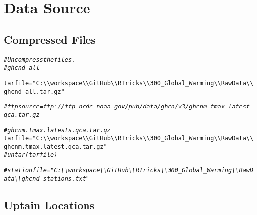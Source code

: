 \documentclass{article}\usepackage[]{graphicx}\usepackage[]{color}
\makeatletter
\newcommand{\hlstr}[1]{\textcolor[rgb]{0.192,0.494,0.8}{#1}}%
\newcommand{\hlcom}[1]{\textcolor[rgb]{0.678,0.584,0.686}{\textit{#1}}}%
\newcommand{\hlstd}[1]{\textcolor[rgb]{0.345,0.345,0.345}{#1}}%
\newcommand{\hlkwb}[1]{\textcolor[rgb]{0.69,0.353,0.396}{#1}}%
\newenvironment{kframe}{%
 \def\at@end@of@kframe{}%
 \ifinner\ifhmode%
  \def\at@end@of@kframe{\end{minipage}}%
  \begin{minipage}{\columnwidth}%
 \fi\fi%
 \def\FrameCommand##1{\hskip\@totalleftmargin \hskip-\fboxsep
 \colorbox{shadecolor}{##1}\hskip-\fboxsep
     \hskip-\linewidth \hskip-\@totalleftmargin \hskip\columnwidth}%
 \MakeFramed {\advance\hsize-\width
   \@totalleftmargin\z@ \linewidth\hsize
   \@setminipage}}%
 {\par\unskip\endMakeFramed%
 \at@end@of@kframe}
\newenvironment{knitrout}{}{} %
\makeatother
\begin{document}
\section{Data Source}


\subsection{Compressed Files}


\begin{knitrout}
\color{fgcolor}\begin{kframe}
\begin{alltt}
\hlcom{# Uncompress the files.}
\hlcom{# ghcnd_all}

\hlstd{tarfile} \hlkwb{=} \hlstr{"C:\textbackslash{}\textbackslash{}workspace\textbackslash{}\textbackslash{}GitHub\textbackslash{}\textbackslash{}RTricks\textbackslash{}\textbackslash{}300_Global_Warming\textbackslash{}\textbackslash{}Raw Data\textbackslash{}\textbackslash{}ghcnd_all.tar.gz"}

\hlcom{#ftpsource = ftp://ftp.ncdc.noaa.gov/pub/data/ghcn/v3/ghcnm.tmax.latest.qca.tar.gz}


\hlcom{#ghcnm.tmax.latests.qca.tar.qz}
\hlstd{tarfile} \hlkwb{=} \hlstr{"C:\textbackslash{}\textbackslash{}workspace\textbackslash{}\textbackslash{}GitHub\textbackslash{}\textbackslash{}RTricks\textbackslash{}\textbackslash{}300_Global_Warming\textbackslash{}\textbackslash{}Raw Data\textbackslash{}\textbackslash{}ghcnm.tmax.latest.qca.tar.gz"}
\hlcom{# untar(tarfile)}
\end{alltt}
\end{kframe}
\end{knitrout}


\begin{knitrout}
\color{fgcolor}\begin{kframe}
\begin{alltt}
\hlcom{#stationfile = "C:\textbackslash{}\textbackslash{}workspace\textbackslash{}\textbackslash{}GitHub\textbackslash{}\textbackslash{}RTricks\textbackslash{}\textbackslash{}300_Global_Warming\textbackslash{}\textbackslash{}Raw Data\textbackslash{}\textbackslash{}ghcnd-stations.txt"}
\end{alltt}
\end{kframe}
\end{knitrout}

\subsection{Uptain Locations}
\end{document}
